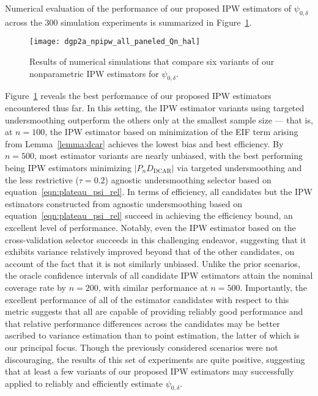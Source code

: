 Numerical evaluation of the performance of our proposed IPW estimators of
$\psi_{0,\delta}$ across the $300$ simulation experiments is summarized in
Figure~\ref{fig:dgp2a_npipw}.
\begin{figure}[H]
  \centering
  \texttt{[image: dgp2a\_npipw\_all\_paneled\_Qn\_hal]}
  \caption{Results of numerical simulations that compare six variants of our
  nonparametric IPW estimators for $\psi_{0,\delta}$.}
  \label{fig:dgp2a_npipw}
\end{figure}
Figure~\ref{fig:dgp2a_npipw} reveals the best performance of our proposed IPW
estimators encountered thus far. In this setting, the IPW estimator variants
using targeted undersmoothing outperform the others only at the smallest sample
size --- that is, at $n=100$, the IPW estimator based on minimization of the
EIF term arising from Lemma~\ref{lemma:dcar} achieves the lowest bias and best
efficiency. By $n=500$, most estimator variants are nearly unbiased, with the
best performing being IPW estimators minimizing $\lvert P_n D_\text{DCAR}
\rvert$ via targeted undersmoothing and the less restrictive ($\tau = 0.2$)
agnostic undersmoothing selector based on equation~\ref{eqn:plateau_psi_rel}. In
terms of efficiency, all candidates but the IPW estimators constructed from
agnostic undersmoothing based on equation~\ref{eqn:plateau_psi_rel} succeed in
achieving the efficiency bound, an excellent level of performance. Notably, even
the IPW estimator based on the cross-validation selector succeeds in this
challenging endeavor, suggesting that it exhibits variance relatively improved
beyond that of the other candidates, on account of the fact that it is not
similarly unbiased. Unlike the prior scenarios, the oracle confidence intervals
of all candidate IPW estimators attain the nominal coverage rate by $n=200$,
with similar performance at $n=500$. Importantly, the excellent performance of
all of the estimator candidates with respect to this metric suggests that all
are capable of providing reliably good performance and that relative performance
differences across the candidates may be better ascribed to variance estimation
than to point estimation, the latter of which is our principal focus. Though the
previously considered scenarios were not discouraging, the results of this set
of experiments are quite positive, suggesting that at least a few variants of
our proposed IPW estimators may successfully applied to reliably and efficiently
estimate $\psi_{0,\delta}$.

